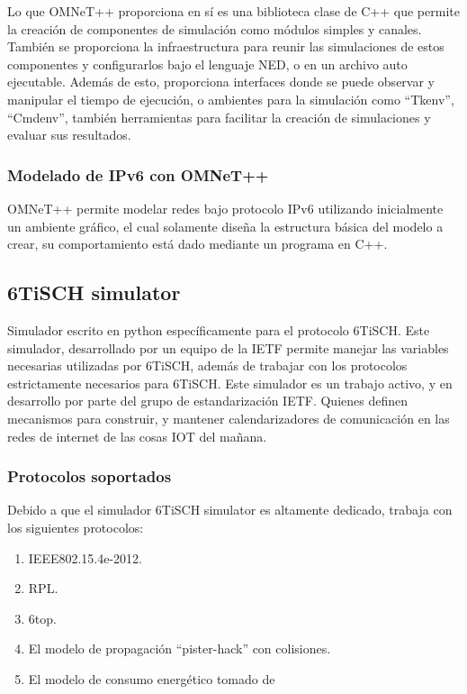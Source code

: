 Lo que OMNeT++ proporciona en sí es una biblioteca clase de C++ que permite la creación de componentes de simulación como módulos simples y canales. También se proporciona la infraestructura para reunir las simulaciones de estos componentes y configurarlos bajo el lenguaje NED, o en un archivo auto ejecutable. Además de esto, proporciona interfaces donde se puede observar y manipular el tiempo de ejecución, o ambientes para la simulación como ``Tkenv'', ``Cmdenv'', también herramientas para facilitar la creación de simulaciones y evaluar sus resultados.\cite{omnet}

\subsubsection{Modelado de IPv6 con OMNeT++}

OMNeT++ permite modelar redes bajo protocolo IPv6 utilizando inicialmente un ambiente gráfico, el cual solamente diseña la estructura básica del modelo a crear, su comportamiento está dado mediante un programa en C++.


\newpage

\subsection{6TiSCH simulator}
Simulador escrito en python específicamente para el protocolo 6TiSCH. Este simulador, desarrollado por un equipo de la IETF permite manejar las variables necesarias utilizadas por 6TiSCH, además de trabajar con los protocolos estrictamente necesarios para 6TiSCH.
Este simulador es un trabajo activo, y en desarrollo por parte del grupo de estandarización IETF. Quienes definen mecanismos para construir, y mantener calendarizadores de comunicación en las redes de internet de las cosas IOT del mañana.

\subsubsection{Protocolos soportados}

Debido a que el simulador 6TiSCH simulator es altamente dedicado, trabaja con los siguientes protocolos:

\begin{enumerate}
    \item IEEE802.15.4e-2012.
    \item RPL.
    \item 6top.
    \item El modelo  de propagación ``pister-hack'' con colisiones.
    \item El modelo de consumo energético tomado de \cite{vilajosana2014realistic}
\end{enumerate}


